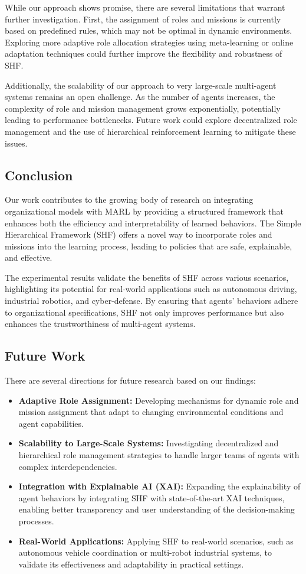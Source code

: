 \documentclass[sigconf,anonymous]{aamas}
\begin{document}
While our approach shows promise, there are several limitations that warrant further investigation. First, the assignment of roles and missions is currently based on predefined rules, which may not be optimal in dynamic environments. Exploring more adaptive role allocation strategies using meta-learning or online adaptation techniques could further improve the flexibility and robustness of SHF.

Additionally, the scalability of our approach to very large-scale multi-agent systems remains an open challenge. As the number of agents increases, the complexity of role and mission management grows exponentially, potentially leading to performance bottlenecks. Future work could explore decentralized role management and the use of hierarchical reinforcement learning to mitigate these issues.

\subsection{Conclusion}
Our work contributes to the growing body of research on integrating organizational models with MARL by providing a structured framework that enhances both the efficiency and interpretability of learned behaviors. The Simple Hierarchical Framework (SHF) offers a novel way to incorporate roles and missions into the learning process, leading to policies that are safe, explainable, and effective.

The experimental results validate the benefits of SHF across various scenarios, highlighting its potential for real-world applications such as autonomous driving, industrial robotics, and cyber-defense. By ensuring that agents' behaviors adhere to organizational specifications, SHF not only improves performance but also enhances the trustworthiness of multi-agent systems.

\subsection{Future Work}
There are several directions for future research based on our findings:

\begin{itemize}
    \item \textbf{Adaptive Role Assignment:} Developing mechanisms for dynamic role and mission assignment that adapt to changing environmental conditions and agent capabilities.
    \item \textbf{Scalability to Large-Scale Systems:} Investigating decentralized and hierarchical role management strategies to handle larger teams of agents with complex interdependencies.
    \item \textbf{Integration with Explainable AI (XAI):} Expanding the explainability of agent behaviors by integrating SHF with state-of-the-art XAI techniques, enabling better transparency and user understanding of the decision-making processes.
    \item \textbf{Real-World Applications:} Applying SHF to real-world scenarios, such as autonomous vehicle coordination or multi-robot industrial systems, to validate its effectiveness and adaptability in practical settings.
\end{itemize}
\end{document}
